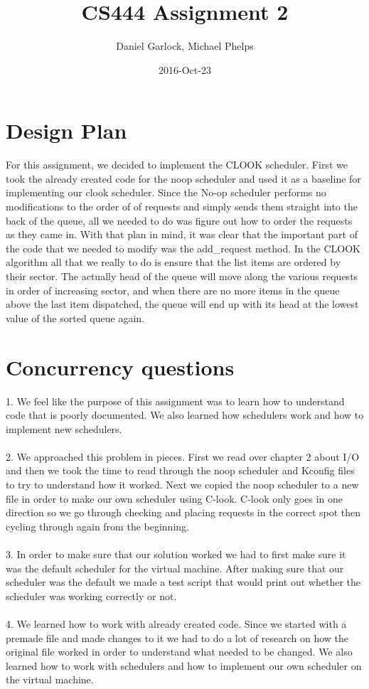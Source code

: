 \documentclass[letterpaper,10pt,titlepage,onecolumn,draftclsnofoot]{IEEETran}
\title{CS444 Assignment 2}
\author{Daniel Garlock, Michael Phelps}
\date{2016-Oct-23}
\begin{document}
\maketitle

\newpage
\tableofcontents
\newpage

\section{Design Plan}
For this assignment, we decided to implement the CLOOK scheduler. First we took the already created code for the noop scheduler and used it as a baseline for implementing our clook scheduler. Since the No-op scheduler performs no modifications to the order of of requests and simply sends them straight into the back of the queue, all we needed to do was figure out how to order the requests as they came in. With that plan in mind, it was clear that the important part of the code that we needed to modify was the add\_request method. In the CLOOK algorithm all that we really to do is ensure that the list items are ordered by their sector. The actually head of the queue will move along the various requests in order of increasing sector, and when there are no more items in the queue above the last item dispatched, the queue will end up with its head at the lowest value of the sorted queue again.

\section{Concurrency questions}
    1. We feel like the purpose of this assignment was to learn how to understand code that is poorly documented. We also learned how schedulers work and how to implement new schedulers.\\
\\
    2. We approached this problem in pieces. First we read over chapter 2 about I/O and then we took the time to read through the noop scheduler and Kconfig files to try to understand how it worked. Next we copied the noop scheduler to a new file in order to make our own scheduler using C-look. C-look only goes in one direction so we go through checking and placing requests in the correct spot then cycling through again from the beginning.  \\
\\
    3. In order to make sure that our solution worked we had to first make sure it was the default scheduler for the virtual machine. After making sure that our scheduler was the default we made a test script that would print out whether the scheduler was working correctly or not.\\
\\
    4. We learned how to work with already created code. Since we started with a premade file and made changes to it we had to do a lot of research on how the original file worked in order to understand what needed to be changed. We also learned how to work with schedulers and how to implement our own scheduler on the virtual machine.\\ 
\end{document}
